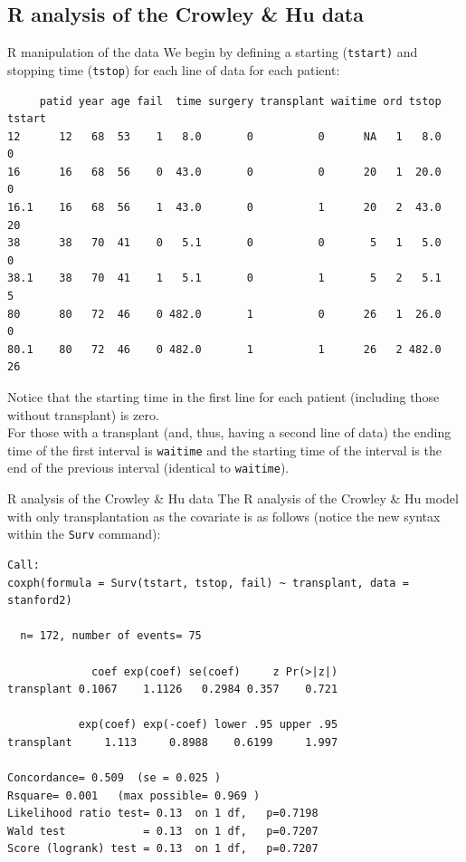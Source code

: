 \documentclass[envcountsect, 10pt, portrait, palatino]{beamer}
\begin{document}
\subsection{R analysis of the Crowley \& Hu data}
\begin{frame}[fragile]{R manipulation of the data}
We begin by defining a starting ({\tt tstart)} and stopping time ({\tt tstop}) for each line of data for each patient:

\scriptsize
\begin{verbatim}
     patid year age fail  time surgery transplant waitime ord tstop tstart
12      12   68  53    1   8.0       0          0      NA   1   8.0      0
16      16   68  56    0  43.0       0          0      20   1  20.0      0
16.1    16   68  56    1  43.0       0          1      20   2  43.0     20
38      38   70  41    0   5.1       0          0       5   1   5.0      0
38.1    38   70  41    1   5.1       0          1       5   2   5.1      5
80      80   72  46    0 482.0       1          0      26   1  26.0      0
80.1    80   72  46    0 482.0       1          1      26   2 482.0     26
\end{verbatim}
\normalsize
Notice that the starting time in the first line for each patient (including those without transplant) is zero.  \\[2ex]
For those with a transplant (and, thus, having a second line of data) the ending time of the first interval is {\tt waitime} and the starting time of the interval is the end of the previous interval (identical to {\tt waitime}).
\end{frame}
\begin{frame}[fragile]{R analysis of the Crowley \& Hu data}
The R analysis of the Crowley \& Hu model with only transplantation as the covariate is as follows (notice the new syntax within the {\tt Surv} command):

\scriptsize
\begin{verbatim}
Call:
coxph(formula = Surv(tstart, tstop, fail) ~ transplant, data = stanford2)

  n= 172, number of events= 75

             coef exp(coef) se(coef)     z Pr(>|z|)
transplant 0.1067    1.1126   0.2984 0.357    0.721

           exp(coef) exp(-coef) lower .95 upper .95
transplant     1.113     0.8988    0.6199     1.997

Concordance= 0.509  (se = 0.025 )
Rsquare= 0.001   (max possible= 0.969 )
Likelihood ratio test= 0.13  on 1 df,   p=0.7198
Wald test            = 0.13  on 1 df,   p=0.7207
Score (logrank) test = 0.13  on 1 df,   p=0.7207
\end{verbatim}
\normalsize
\end{frame} 
\end{document}
